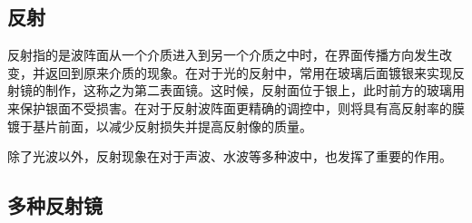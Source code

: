 
\begin{issues}
\issueDraft
\issueMissDepend
\end{issues}

\subsection{反射}
反射指的是波阵面从一个介质进入到另一个介质之中时，在界面传播方向发生改变，并返回到原来介质的现象。在对于光的反射中，常用在玻璃后面镀银来实现反射镜的制作，这称之为第二表面镜。这时候，反射面位于银上，此时前方的玻璃用来保护银面不受损害。在对于反射波阵面更精确的调控中，则将具有高反射率的膜镀于基片前面，以减少反射损失并提高反射像的质量。

除了光波以外，反射现象在对于声波、水波等多种波中，也发挥了重要的作用。
\subsection{多种反射镜}